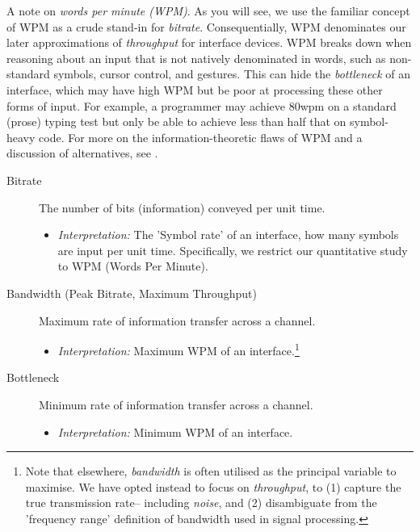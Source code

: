 \documentclass[logo,bsc,singlespacing,parskip]{infthesis}
\begin{document}
A note on \emph{words per minute (WPM)}.
As you will see, we use the familiar concept of WPM as a crude stand-in for \emph{bitrate}.
Consequentially, WPM denominates our later approximations of \emph{throughput} for interface devices.
WPM breaks down when reasoning about an input that is not natively denominated in words, such as non-standard symbols, cursor control, and gestures.
This can hide the \emph{bottleneck} of an interface, which may have high WPM but be poor at processing these other forms of input.
For example, a programmer may achieve 80wpm on a standard (prose) typing test but only be able to achieve less than half that on symbol-heavy code.
For more on the information-theoretic flaws of WPM and a discussion of alternatives, see \autocite[p. 57]{liuInformationTheoryUnified}.

{ %
\begin{mdframed}
\begin{description}
\item[{Bitrate\label{bitrate}}] The number of bits (information) conveyed per unit time.
\begin{itemize}
\item \emph{Interpretation:} The 'Symbol rate' of an interface, how many symbols are input per unit time. 
Specifically, we restrict our quantitative study to WPM (Words Per Minute).
\end{itemize}
\end{description}
\end{mdframed}

\begin{mdframed}
\begin{description}
\item[{Bandwidth\label{bandwidth} (Peak Bitrate, Maximum Throughput)}] Maximum rate of information transfer across a channel.
\begin{itemize}
\item \emph{Interpretation:} Maximum WPM of an interface.\footnote{Note that elsewhere, \emph{bandwidth} is often utilised as the principal variable to maximise. We have opted instead to focus on \emph{throughput}, to (1) capture the true transmission rate-- including \emph{noise}, and (2) disambiguate from the 'frequency range' definition of bandwidth used in signal processing.}
\end{itemize}
\end{description}
\end{mdframed}

\begin{mdframed}
\begin{description}
\item[{Bottleneck\label{bottleneck}}] Minimum rate of information transfer across a channel.
\begin{itemize}
\item \emph{Interpretation:} Minimum WPM of an interface.
\end{itemize}
\end{description}
\end{mdframed}

}
\end{document}
